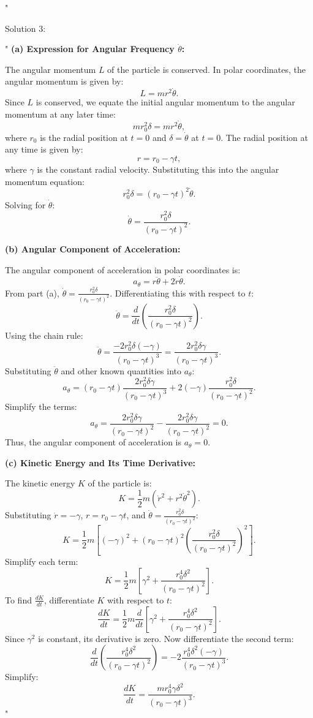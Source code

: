 "

Solution 3:

"
\textbf{(a) Expression for Angular Frequency \( \dot{\theta} \):}

The angular momentum \( L \) of the particle is conserved. In polar coordinates, the angular momentum is given by:
\[
L = m r^2 \dot{\theta}.
\]
Since \( L \) is conserved, we equate the initial angular momentum to the angular momentum at any later time:
\[
m r_0^2 \delta = m r^2 \dot{\theta},
\]
where \( r_0 \) is the radial position at \( t = 0 \) and \( \delta = \dot{\theta} \) at \( t = 0 \). The radial position at any time is given by:
\[
r = r_0 - \gamma t,
\]
where \( \gamma \) is the constant radial velocity. Substituting this into the angular momentum equation:
\[
r_0^2 \delta = (r_0 - \gamma t)^2 \dot{\theta}.
\]
Solving for \( \dot{\theta} \):
\[
\dot{\theta} = \frac{r_0^2 \delta}{(r_0 - \gamma t)^2}.
\]

\textbf{(b) Angular Component of Acceleration:}

The angular component of acceleration in polar coordinates is:
\[
a_\theta = r \ddot{\theta} + 2 \dot{r} \dot{\theta}.
\]
From part (a), \( \dot{\theta} = \frac{r_0^2 \delta}{(r_0 - \gamma t)^2} \). Differentiating this with respect to \( t \):
\[
\ddot{\theta} = \frac{d}{dt} \left( \frac{r_0^2 \delta}{(r_0 - \gamma t)^2} \right).
\]
Using the chain rule:
\[
\ddot{\theta} = \frac{-2 r_0^2 \delta (-\gamma)}{(r_0 - \gamma t)^3} = \frac{2 r_0^2 \delta \gamma}{(r_0 - \gamma t)^3}.
\]
Substituting \( \ddot{\theta} \) and other known quantities into \( a_\theta \):
\[
a_\theta = (r_0 - \gamma t) \frac{2 r_0^2 \delta \gamma}{(r_0 - \gamma t)^3} + 2(-\gamma) \frac{r_0^2 \delta}{(r_0 - \gamma t)^2}.
\]
Simplify the terms:
\[
a_\theta = \frac{2 r_0^2 \delta \gamma}{(r_0 - \gamma t)^2} - \frac{2 r_0^2 \delta \gamma}{(r_0 - \gamma t)^2} = 0.
\]
Thus, the angular component of acceleration is \( a_\theta = 0 \).

\textbf{(c) Kinetic Energy and Its Time Derivative:}

The kinetic energy \( K \) of the particle is:
\[
K = \frac{1}{2} m \left( \dot{r}^2 + r^2 \dot{\theta}^2 \right).
\]
Substituting \( \dot{r} = -\gamma \), \( r = r_0 - \gamma t \), and \( \dot{\theta} = \frac{r_0^2 \delta}{(r_0 - \gamma t)^2} \):
\[
K = \frac{1}{2} m \left[ (-\gamma)^2 + (r_0 - \gamma t)^2 \left( \frac{r_0^2 \delta}{(r_0 - \gamma t)^2} \right)^2 \right].
\]
Simplify each term:
\[
K = \frac{1}{2} m \left[ \gamma^2 + \frac{r_0^4 \delta^2}{(r_0 - \gamma t)^2} \right].
\]
To find \( \frac{dK}{dt} \), differentiate \( K \) with respect to \( t \):
\[
\frac{dK}{dt} = \frac{1}{2} m \frac{d}{dt} \left[ \gamma^2 + \frac{r_0^4 \delta^2}{(r_0 - \gamma t)^2} \right].
\]
Since \( \gamma^2 \) is constant, its derivative is zero. Now differentiate the second term:
\[
\frac{d}{dt} \left( \frac{r_0^4 \delta^2}{(r_0 - \gamma t)^2} \right) = -2 \frac{r_0^4 \delta^2 (-\gamma)}{(r_0 - \gamma t)^3}.
\]
Simplify:
\[
\frac{dK}{dt} = \frac{m r_0^4 \gamma \delta^2}{(r_0 - \gamma t)^3}.
\]
"

